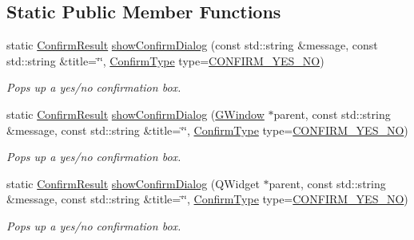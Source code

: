 \subsection*{Static Public Member Functions}
\begin{DoxyCompactItemize}
\item 
static \mbox{\hyperlink{classGOptionPane_a1cc9e8685029e39646671ed71f32d47d}{Confirm\+Result}} \mbox{\hyperlink{classGOptionPane_a779ca75a58dcaba1000f064f23f83291}{show\+Confirm\+Dialog}} (const std\+::string \&message, const std\+::string \&title=\char`\"{}\char`\"{}, \mbox{\hyperlink{classGOptionPane_a6a1aaf19c06f5a6bef89ea6415547049}{Confirm\+Type}} type=\mbox{\hyperlink{classGOptionPane_a6a1aaf19c06f5a6bef89ea6415547049a964914d27eb73a202938a53f43adc4b1}{C\+O\+N\+F\+I\+R\+M\+\_\+\+Y\+E\+S\+\_\+\+NO}})
\begin{DoxyCompactList}\small\item\em Pops up a yes/no confirmation box. \end{DoxyCompactList}\item 
static \mbox{\hyperlink{classGOptionPane_a1cc9e8685029e39646671ed71f32d47d}{Confirm\+Result}} \mbox{\hyperlink{classGOptionPane_a9afd93d6b7b63d77370c87e60285ae71}{show\+Confirm\+Dialog}} (\mbox{\hyperlink{classGWindow}{G\+Window}} $\ast$parent, const std\+::string \&message, const std\+::string \&title=\char`\"{}\char`\"{}, \mbox{\hyperlink{classGOptionPane_a6a1aaf19c06f5a6bef89ea6415547049}{Confirm\+Type}} type=\mbox{\hyperlink{classGOptionPane_a6a1aaf19c06f5a6bef89ea6415547049a964914d27eb73a202938a53f43adc4b1}{C\+O\+N\+F\+I\+R\+M\+\_\+\+Y\+E\+S\+\_\+\+NO}})
\begin{DoxyCompactList}\small\item\em Pops up a yes/no confirmation box. \end{DoxyCompactList}\item 
static \mbox{\hyperlink{classGOptionPane_a1cc9e8685029e39646671ed71f32d47d}{Confirm\+Result}} \mbox{\hyperlink{classGOptionPane_a25726b3ff4882c3a7ef9be5fd4c4f2ef}{show\+Confirm\+Dialog}} (Q\+Widget $\ast$parent, const std\+::string \&message, const std\+::string \&title=\char`\"{}\char`\"{}, \mbox{\hyperlink{classGOptionPane_a6a1aaf19c06f5a6bef89ea6415547049}{Confirm\+Type}} type=\mbox{\hyperlink{classGOptionPane_a6a1aaf19c06f5a6bef89ea6415547049a964914d27eb73a202938a53f43adc4b1}{C\+O\+N\+F\+I\+R\+M\+\_\+\+Y\+E\+S\+\_\+\+NO}})
\begin{DoxyCompactList}\small\item\em Pops up a yes/no confirmation box. \end{DoxyCompactList}\item 

\end{DoxyCompactItemize}

